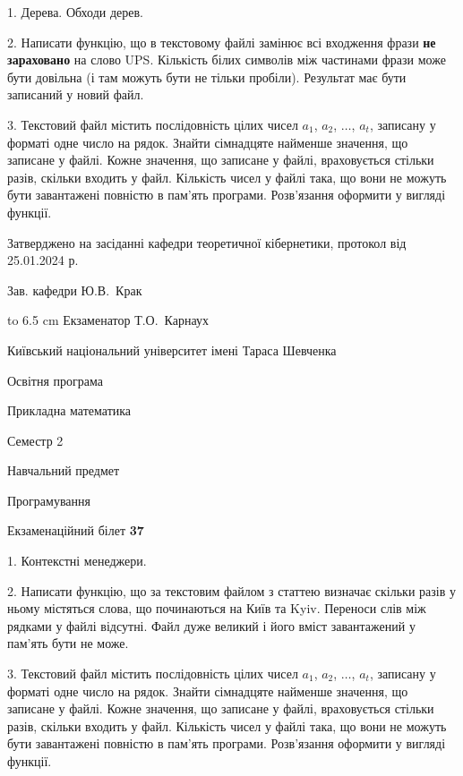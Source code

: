 \documentclass[12pt, ukrainian]{article}
\begin{document}
{%
1. Дерева. Обходи дерев.%
\par
2. Написати функцію, що в текстовому файлі замінює всі входження фрази \textbf{не зараховано} на слово UPS. Кількість білих символів між частинами фрази може бути довільна (і там можуть бути не тільки пробіли). Результат має бути записаний у новий файл.

\par
3. Текстовий файл містить послідовність цілих чисел $a_1$, $a_2$, $\ldots$, $a_t$, записану у форматі одне число на рядок. Знайти сімнадцяте найменше значення, що записане у файлі. Кожне значення, що записане у файлі, враховується стільки разів, скільки входить у файл. Кількість чисел у файлі така, що вони не можуть бути завантажені повністю в пам'ять програми. Розв'язання оформити у вигляді функції.

}
{\smallskip\smallskip \begin {scriptsize} Затверджено на засіданні кафедри теоретичної кібернетики, протокол   від   25.01.2024 р.\par\smallskip\smallskip\smallskip\smallskip
{\parbox {6.5 cm} {Зав. кафедри \dotfill Ю.В.~Крак}}\hspace {0.7cm} {\hbox to 6.5 cm { Екзаменатор \dotfill Т.О.~Карнаух}} \end{scriptsize}}
\newpage
{{\begin {scriptsize}\par
{ \center  Київський національний університет імені Тараса Шевченка \par}
{\parbox {5 cm}{Освітня програма \hfill}{\parbox {7 cm}{Прикладна математика\hfill}}\parbox {6 cm}{\hfill Семестр 2}}\par
{\parbox {5 cm} {Навчальний предмет \hfill}\parbox {7 cm}{Програмування \hfill}\parbox {6cm}{\hfill}\par}\vspace{-15pt} \end{scriptsize}}{\center Екзаменаційний білет \No \textbf { 37 }\par}}
{%
1. Контекстні менеджери.%
\par
2. Написати функцію, що за текстовим файлом з статтею визначає скільки разів у ньому містяться слова, що починаються на Київ та Kyiv.  Переноси слів між рядками у файлі відсутні. Файл дуже великий і його вміст завантажений у пам'ять бути не може.

\par
3. Текстовий файл містить послідовність цілих чисел $a_1$, $a_2$, $\ldots$, $a_t$, записану у форматі одне число на рядок. Знайти сімнадцяте найменше значення, що записане у файлі. Кожне значення, що записане у файлі, враховується стільки разів, скільки входить у файл. Кількість чисел у файлі така, що вони не можуть бути завантажені повністю в пам'ять програми. Розв'язання оформити у вигляді функції.

}
\end{document}
